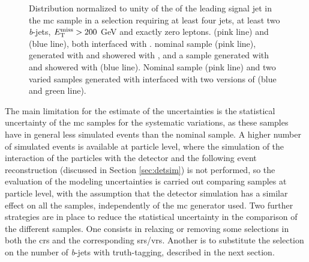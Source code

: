\begin{figure}[htb]
\centering 
{}
\caption{Distribution normalized to unity of the \pt of the leading signal jet in the \ttbar \gls{mc} sample in a selection requiring at least four jets, at least two \textit{b}-jets, $E_{\rm T}^{\mathrm{miss}}>200$ GeV and exactly zero leptons. 
 \PowhegBox (pink line) and \aNLO (blue line), both interfaced with \HWpp.
 nominal sample (pink line), generated with \PowhegBox and showered with \PY, and a sample generated with \PowhegBox and showered with \HWpp (blue line).
 Nominal sample (pink line) and two varied samples generated with \PowhegBox interfaced with two versions of \PY (blue and green line).}\label{fig:ttbar_ptj1_0L_syst}
\end{figure}


The main limitation for the estimate of the uncertainties is the statistical uncertainty of the \gls{mc} samples for the systematic variations, as these samples have in general less simulated events than the nominal sample. 
A higher number of simulated events is available at particle level, where the simulation of the interaction of the particles with the detector and the following event reconstruction (discussed in Section \ref{sec:detsim}) is not performed, so the evaluation of the \ttbar modeling uncertainties is carried out 
comparing samples at particle level, with the assumption that the detector simulation has a similar effect on all the samples, 
independently of the \gls{mc} generator used. Two further strategies are in place to reduce the statistical uncertainty in the comparison of the different samples. 
One consists in relaxing or removing some selections in both the \glspl{cr} and the corresponding \glspl{sr}/\glspl{vr}. 
Another is to substitute the selection on the number of \textit{b}-jets with truth-tagging, described in the next section.

